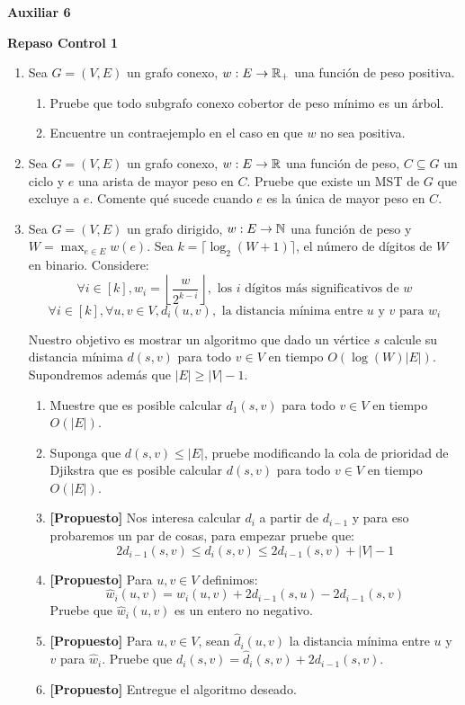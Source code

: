 

\header
\begin{center}
	\LARGE \bf{Auxiliar 6}
\end{center}

\begin{center}
	\bf{Repaso Control 1}\\
\end{center}

\begin{enumerate}[label ={\bf P\arabic*}]
	\item Sea $G=(V,E)$ un grafo conexo, $w:E \to \mathbb{R}_+$ una función de peso positiva.
	\begin{enumerate}
		\item Pruebe que todo subgrafo conexo cobertor de peso mínimo es un árbol.
		\item Encuentre un contraejemplo en el caso en que $w$ no sea positiva.
	\end{enumerate}

	\item Sea $G=(V,E)$ un grafo conexo, $w:E \to \mathbb{R}$ una función de peso, $C \subseteq G$ un ciclo y $e$ una arista de mayor peso en $C$.
	Pruebe que existe un MST de $G$ que excluye a $e$.
	Comente qué sucede cuando $e$ es la única de mayor peso en $C$.

	\item Sea $G=(V, E)$ un grafo dirigido, $w: E \to \mathbb{N}$ una función de peso y $W= \max_{e\in E} w(e)$.
	Sea $k = \lceil \log_2(W+1) \rceil$, el número de dígitos de $W$ en binario. Considere:
	\[\forall i \in [k], w_i = \left\lfloor\frac{w}{2^{k-i}}\right\rfloor, \text{ los $i$ dígitos más significativos de } w\]
	\[\forall i \in [k], \forall u,v \in V, d_i(u, v), \text{ la distancia mínima entre $u$ y $v$ para } w_i\]
	
	Nuestro objetivo es mostrar un algoritmo que dado un vértice $s$ calcule su distancia mínima $d(s, v)$ para todo $v \in V$ en tiempo $O(\log(W)|E|)$. Supondremos además que $|E| \geq |V|-1$.
	\begin{enumerate}
		\item Muestre que es posible calcular $d_1(s, v)$ para todo $v \in V$ en tiempo $O(|E|)$.
		\item Suponga que $d(s, v) \leq |E|$, pruebe modificando la cola de prioridad de Djikstra que es posible calcular $d(s, v)$ para todo $v \in V$ en tiempo $O(|E|)$.
		\item \textbf{[Propuesto]} Nos interesa calcular $d_i$ a partir de $d_{i-1}$ y para eso probaremos un par de cosas, para empezar pruebe que:
		\[2 d_{i-1}(s, v) \leq d_i(s, v) \leq 2 d_{i-1}(s, v)+|V|-1\]
		\item \textbf{[Propuesto]} Para $u, v \in V$ definimos:
		\[\hat{w}_i(u, v)=w_i(u, v)+2 d_{i-1}(s, u)-2 d_{i-1}(s, v)\]
		Pruebe que $\hat{w}_i(u, v)$ es un entero no negativo.
		\item \textbf{[Propuesto]} Para $u, v \in V$, sean $\hat{d}_i(u,v)$ la distancia mínima entre $u$ y $v$ para $\hat{w}_i$. Pruebe que $d_i(s, v)=\hat{d}_i(s, v)+2 d_{i-1}(s, v)$.
		\item \textbf{[Propuesto]} Entregue el algoritmo deseado.
	\end{enumerate}


\end{enumerate}

